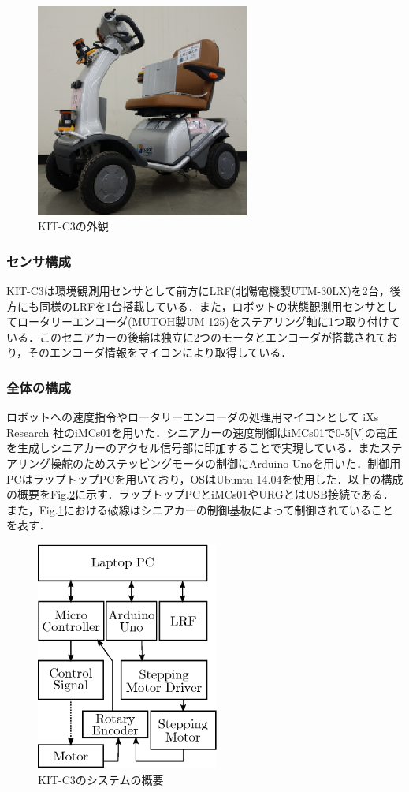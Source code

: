 \documentclass[10pt,a4paper]{jarticle}
\begin{document}
\begin{figure}
  \centering
  \includegraphics[width=7cm]{fig/eps/kitc3.eps}
  \caption{KIT-C3の外観}
  \label{213021_18Dec14}
\end{figure}

\subsubsection{センサ構成}
KIT-C3は環境観測用センサとして前方にLRF(北陽電機製UTM-30LX)を2台，後方にも同様のLRFを1台搭載している．また，ロボットの状態観測用センサとしてロータリーエンコーダ(MUTOH製UM-125)をステアリング軸に1つ取り付けている．このセニアカーの後輪は独立に2つのモータとエンコーダが搭載されており，そのエンコーダ情報をマイコンにより取得している．

\subsubsection{全体の構成}
ロボットへの速度指令やロータリーエンコーダの処理用マイコンとして iXs Research 社のiMCs01を用いた．シニアカーの速度制御はiMCs01で0-5[V]の電圧を生成しシニアカーのアクセル信号部に印加することで実現している．またステアリング操舵のためステッピングモータの制御にArduino Unoを用いた．制御用PCはラップトップPCを用いており，OSはUbuntu 14.04を使用した．以上の構成の概要をFig.\ref{225251_18Dec14}に示す．ラップトップPCとiMCs01やURGとはUSB接続である．また，Fig.\ref{213021_18Dec14}における破線はシニアカーの制御基板によって制御されていることを表す．

\begin{figure}[tbp]
  \centering
  \includegraphics[width=6cm]{fig/eps/kitc3_overview.eps}
  \caption{KIT-C3のシステムの概要}
  \label{225251_18Dec14}
\end{figure}
\end{document}
